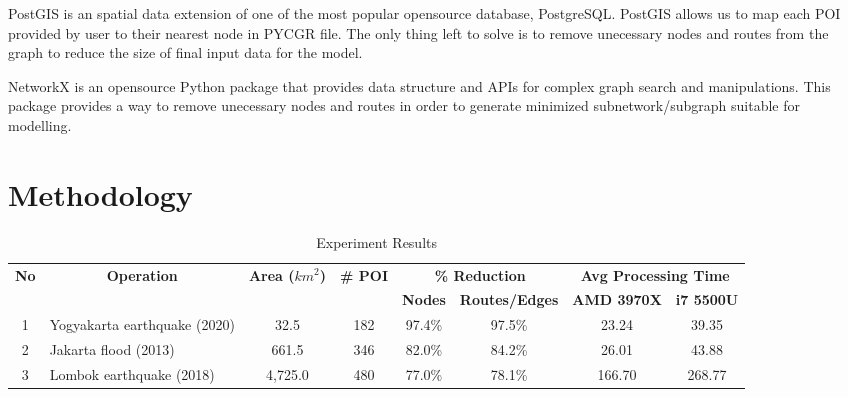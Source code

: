 \documentclass[conference]{IEEEtran}
\begin{document}
PostGIS\cite{postgis2019postgis} is an spatial data extension of one of the most popular opensource database, PostgreSQL\cite{postgresql1996postgresql}. PostGIS allows us to map each POI provided by user to their nearest node in PYCGR file. The only thing left to solve is to remove unecessary nodes and routes from the graph to reduce the size of final input data for the model.

NetworkX\cite{SciPyProceedings_11} is an opensource Python package that provides data structure and APIs for complex graph search and manipulations. This package provides a way to remove unecessary nodes and routes in order to generate minimized subnetwork/subgraph suitable for modelling.

\section{Methodology}

\bgroup
\def\arraystretch{1.5}
\begin{table}[htbp]
\caption{Experiment Results}
\begin{center}
\begin{tabular}{|c|l|c|c|c|c|c|c|}
\hline
\multicolumn{1}{|c|}{\multirow{2}{*}{\textbf{No}}} & 
\multicolumn{1}{c|}{\multirow{2}{*}{\textbf{Operation}}} & 
\multicolumn{1}{c|}{\multirow{2}{*}{\textbf{Area ($km^2$)}}} & 
\multicolumn{1}{c|}{\multirow{2}{*}{\textbf{\# POI}}} & 
\multicolumn{2}{c|}{\textbf{\% Reduction}} & 
\multicolumn{2}{c|}{\textbf{Avg Processing Time}} \\
\cline{5-8}
\multicolumn{1}{|c|}{} & 
\multicolumn{1}{c|}{} & 
\multicolumn{1}{c|}{} & 
\multicolumn{1}{c|}{} & 
\multicolumn{1}{c|}{\textbf{Nodes}} & 
\multicolumn{1}{c|}{\textbf{Routes/Edges}} & 
\multicolumn{1}{c|}{\textbf{AMD 3970X}} &
\multicolumn{1}{c|}{\textbf{i7 5500U}} \\ 
\hline
1 & Yogyakarta earthquake (2020)	& 32.5		& 182 & 	97.4\% & 97.5\% 	& 23.24 & 39.35 \\ \hline
2 & Jakarta flood (2013) 			& 661.5		& 346 & 	82.0\%	& 84.2\% 	& 26.01 & 43.88 \\ \hline
3 & Lombok earthquake (2018) 		& 4,725.0	& 480 & 	77.0\%	& 78.1\% 	& 166.70 & 268.77 \\ \hline
\end{tabular}
\label{table_experiment_results}
\end{center}
\end{table}
\egroup
\end{document}
